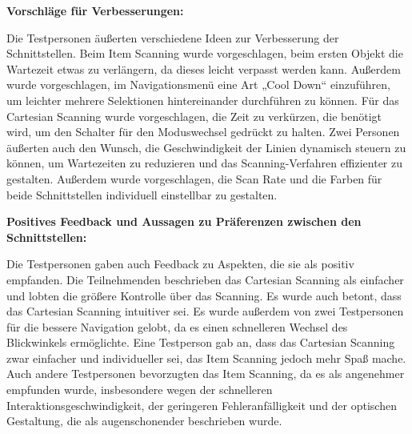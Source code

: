 \textbf{Vorschläge für Verbesserungen:}

Die Testpersonen äußerten verschiedene Ideen zur Verbesserung der Schnittstellen. Beim Item Scanning wurde vorgeschlagen, beim ersten Objekt die Wartezeit etwas zu verlängern, da dieses leicht verpasst werden kann. Außerdem wurde vorgeschlagen, im Navigationsmenü eine Art „Cool Down“ einzuführen, um leichter mehrere Selektionen hintereinander durchführen zu können. Für das Cartesian Scanning wurde vorgeschlagen, die Zeit zu verkürzen, die benötigt wird, um den Schalter für den Moduswechsel gedrückt zu halten. Zwei Personen äußerten auch den Wunsch, die Geschwindigkeit der Linien dynamisch steuern zu können, um Wartezeiten zu reduzieren und das Scanning-Verfahren effizienter zu gestalten. Außerdem wurde vorgeschlagen, die Scan Rate und die Farben für beide Schnittstellen individuell einstellbar zu gestalten.

\textbf{Positives Feedback und Aussagen zu Präferenzen zwischen den Schnittstellen:}

Die Testpersonen gaben auch Feedback zu Aspekten, die sie als positiv empfanden. Die Teilnehmenden beschrieben das Cartesian Scanning als einfacher und lobten die größere Kontrolle über das Scanning. Es wurde auch betont, dass das Cartesian Scanning intuitiver sei. Es wurde außerdem von zwei Testpersonen für die bessere Navigation gelobt, da es einen schnelleren Wechsel des Blickwinkels ermöglichte. Eine Testperson gab an, dass das Cartesian Scanning zwar einfacher und individueller sei, das Item Scanning jedoch mehr Spaß mache. Auch andere Testpersonen bevorzugten das Item Scanning, da es als angenehmer empfunden wurde, insbesondere wegen der schnelleren Interaktionsgeschwindigkeit, der geringeren Fehleranfälligkeit und der optischen Gestaltung, die als augenschonender beschrieben wurde. 


